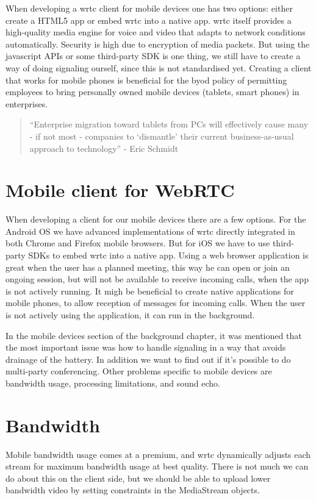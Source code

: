 When developing a \gls{wrtc} client for mobile devices one has two options: either create a HTML5 app or embed \gls{wrtc} into a native app. \gls{wrtc} itself provides a high-quality media engine for voice and video that adapts to network conditions automatically. Security is high due to encryption of media packets. But using the javascript APIs or some third-party SDK is one thing, we still have to create a way of doing signaling ourself, since this is not standardised yet. Creating a client that works for mobile phones is beneficial for the \gls{byod} policy of permitting employees to bring personally owned mobile devices (tablets, smart phones) in enterprises.

\begin{quote}
``Enterprise migration toward tablets from PCs will effectively cause many - if not most - companies to `dismantle' their current business-as-usual approach to technology'' - Eric Schmidt
\end{quote}


\section{Mobile client for WebRTC}
When developing a client for our mobile devices there are a few options. For the Android OS we have advanced implementations of \gls{wrtc} directly integrated in both Chrome and Firefox mobile browsers. But for iOS we have to use third-party SDKs to embed \gls{wrtc} into a native app. Using a web browser application is great when the user has a planned meeting, this way he can open or join an ongoing session, but will not be available to receive incoming calls, when the app is not actively running. It migh be beneficial to create native applications for mobile phones, to allow reception of messages for incoming calls. When the user is not actively using the application, it can run in the background.

In the mobile devices section of the background chapter, it was mentioned that the most important issue was how to handle signaling in a way that avoids drainage of the battery. In addition we want to find out if it's possible to do multi-party conferencing. Other problems specific to mobile devices are bandwidth usage, processing limitations, and sound echo.

\section{Bandwidth}
Mobile bandwidth usage comes at a premium, and \gls{wrtc} dynamically adjusts each stream for maximum bandwidth usage at best quality. There is not much we can do about this on the client side, but we should be able to upload lower bandwidth video by setting constraints in the MediaStream objects. 


